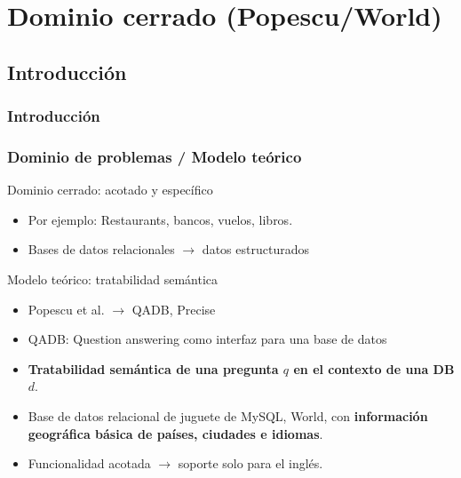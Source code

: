 \fontsize{9.5pt}{8.2}\selectfont
\section{Dominio cerrado (Popescu/World)}
\subsection{Introducción}

\frametitle{Introducción}
\begin{frame}[<+->]
  \frametitle{Dominio de problemas / Modelo teórico}
   \begin{block}{Dominio cerrado: acotado y específico}
      \begin{itemize}
          \item Por ejemplo: Restaurants, bancos, vuelos, libros.
          \item Bases de datos relacionales $\rightarrow$ datos estructurados
      \end{itemize}
    \end{block}

  \begin{block}{Modelo teórico: tratabilidad semántica}
    \begin{itemize}
          \item Popescu et al. $\rightarrow$ QADB, Precise
          \item QADB: Question answering como interfaz para una base de datos
          \item \textbf{Tratabilidad semántica de una pregunta $q$ en el contexto de una DB $d$}.
          \item Base de datos relacional de juguete de MySQL, World, con \textbf{información geográfica básica de países, ciudades e idiomas}.
          \item Funcionalidad acotada  $\rightarrow$ soporte solo para el inglés.
    \end{itemize}
  \end{block}
\end{frame}


